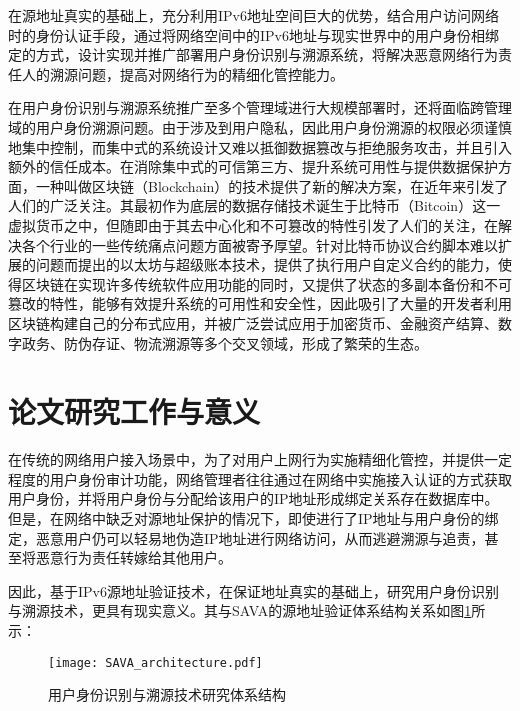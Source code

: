   在源地址真实的基础上，充分利用IPv6地址空间巨大的优势，结合用户访问网络时的身份认证手段，通过将网络空间中的IPv6地址与现实世界中的用户身份相绑定的方式，设计实现并推广部署用户身份识别与溯源系统，将解决恶意网络行为责任人的溯源问题，提高对网络行为的精细化管控能力。

  在用户身份识别与溯源系统推广至多个管理域进行大规模部署时，还将面临跨管理域的用户身份溯源问题。由于涉及到用户隐私，因此用户身份溯源的权限必须谨慎地集中控制，而集中式的系统设计又难以抵御数据篡改与拒绝服务攻击，并且引入额外的信任成本。在消除集中式的可信第三方、提升系统可用性与提供数据保护方面，一种叫做区块链（Blockchain）的技术提供了新的解决方案，在近年来引发了人们的广泛关注。其最初作为底层的数据存储技术诞生于比特币（Bitcoin）\cite{nakamoto2019bitcoin}这一虚拟货币之中，但随即由于其去中心化和不可篡改的特性引发了人们的关注，在解决各个行业的一些传统痛点问题方面被寄予厚望。针对比特币协议合约脚本难以扩展的问题而提出的以太坊\cite{wood2014ethereum}与超级账本技术\cite{dhillon2017hyperledger}，提供了执行用户自定义合约的能力，使得区块链在实现许多传统软件应用功能的同时，又提供了状态的多副本备份和不可篡改的特性，能够有效提升系统的可用性和安全性，因此吸引了大量的开发者利用区块链构建自己的分布式应用，并被广泛尝试应用于加密货币、金融资产结算、数字政务、防伪存证、物流溯源等多个交叉领域，形成了繁荣的生态。

  \section{论文研究工作与意义}
  \label{introduction:work}
  在传统的网络用户接入场景中，为了对用户上网行为实施精细化管控，并提供一定程度的用户身份审计功能，网络管理者往往通过在网络中实施接入认证的方式获取用户身份，并将用户身份与分配给该用户的IP地址形成绑定关系存在数据库中。但是，在网络中缺乏对源地址保护的情况下，即使进行了IP地址与用户身份的绑定，恶意用户仍可以轻易地伪造IP地址进行网络访问，从而逃避溯源与追责，甚至将恶意行为责任转嫁给其他用户。

  因此，基于IPv6源地址验证技术，在保证地址真实的基础上，研究用户身份识别与溯源技术，更具有现实意义。其与SAVA的源地址验证体系结构关系如图\ref{fig:SAVA_architecture}所示：
  \begin{figure}[ht]
    \centering
    \texttt{[image: SAVA\_architecture.pdf]}
    \caption{用户身份识别与溯源技术研究体系结构}
    \label{fig:SAVA_architecture}
  \end{figure}

